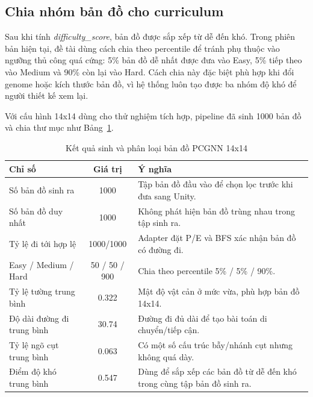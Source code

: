 \subsection{Chia nhóm bản đồ cho curriculum}

Sau khi tính \emph{difficulty\_score}, bản đồ được sắp xếp từ dễ đến khó. Trong phiên bản hiện tại, đề tài dùng cách chia theo percentile để tránh phụ thuộc vào ngưỡng thủ công quá cứng: 5\% bản đồ dễ nhất được đưa vào Easy, 5\% tiếp theo vào Medium và 90\% còn lại vào Hard. Cách chia này đặc biệt phù hợp khi đổi genome hoặc kích thước bản đồ, vì hệ thống luôn tạo được ba nhóm độ khó để người thiết kế xem lại.

Với cấu hình 14x14 dùng cho thử nghiệm tích hợp, pipeline đã sinh 1000 bản đồ và chia thư mục như Bảng~\ref{tab:pcgnn_map_generation_summary}.

\begin{table}[H]
    \centering
    \small
    \caption{Kết quả sinh và phân loại bản đồ PCGNN 14x14}
    \label{tab:pcgnn_map_generation_summary}
    \begin{tabular}{|p{5cm}|c|p{6.7cm}|}
        \hline
        \textbf{Chỉ số} & \textbf{Giá trị} & \textbf{Ý nghĩa} \\
        \hline
        Số bản đồ sinh ra & 1000 & Tập bản đồ đầu vào để chọn lọc trước khi đưa sang Unity. \\
        \hline
        Số bản đồ duy nhất & 1000 & Không phát hiện bản đồ trùng nhau trong tập sinh ra. \\
        \hline
        Tỷ lệ đi tới hợp lệ & 1000/1000 & Adapter đặt P/E và BFS xác nhận bản đồ có đường đi. \\
        \hline
        Easy / Medium / Hard & 50 / 50 / 900 & Chia theo percentile 5\% / 5\% / 90\%. \\
        \hline
        Tỷ lệ tường trung bình & 0.322 & Mật độ vật cản ở mức vừa, phù hợp bản đồ 14x14. \\
        \hline
        Độ dài đường đi trung bình & 30.74 & Đường đi đủ dài để tạo bài toán di chuyển/tiếp cận. \\
        \hline
        Tỷ lệ ngõ cụt trung bình & 0.063 & Có một số cấu trúc bẫy/nhánh cụt nhưng không quá dày. \\
        \hline
        Điểm độ khó trung bình & 0.547 & Dùng để sắp xếp các bản đồ từ dễ đến khó trong cùng tập bản đồ sinh ra. \\
        \hline
    \end{tabular}
\end{table}

